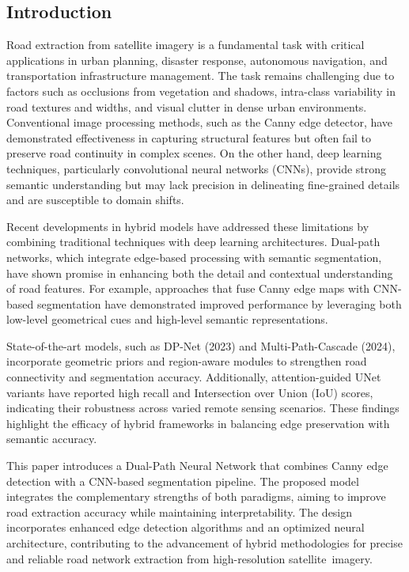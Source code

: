 \documentclass[11pt]{article}
\begin{document}
\begin{multicols}{2}

\section{Introduction}
Road extraction from satellite imagery is a fundamental task with critical applications in urban planning, disaster response, autonomous navigation, and transportation infrastructure management. The task remains challenging due to factors such as occlusions from vegetation and shadows, intra-class variability in road textures and widths, and visual clutter in dense urban environments. Conventional image processing methods, such as the Canny edge detector, have demonstrated effectiveness in capturing structural features but often fail to preserve road continuity in complex scenes. On the other hand, deep learning techniques, particularly convolutional neural networks (CNNs), provide strong semantic understanding but may lack precision in delineating fine-grained details and are susceptible to domain shifts.

Recent developments in hybrid models have addressed these limitations by combining traditional techniques with deep learning architectures. Dual-path networks, which integrate edge-based processing with semantic segmentation, have shown promise in enhancing both the detail and contextual understanding of road features. For example, approaches that fuse Canny edge maps with CNN-based segmentation have demonstrated improved performance by leveraging both low-level geometrical cues and high-level semantic representations.

State-of-the-art models, such as DP-Net (2023) and Multi-Path-Cascade (2024), incorporate geometric priors and region-aware modules to strengthen road connectivity and segmentation accuracy. Additionally, attention-guided UNet variants have reported high recall and Intersection over Union (IoU) scores, indicating their robustness across varied remote sensing scenarios. These findings highlight the efficacy of hybrid frameworks in balancing edge preservation with semantic accuracy.

This paper introduces a Dual-Path Neural Network that combines Canny edge detection with a CNN-based segmentation pipeline. The proposed model integrates the complementary strengths of both paradigms, aiming to improve road extraction accuracy while maintaining interpretability. The design incorporates enhanced edge detection algorithms and an optimized neural architecture, contributing to the advancement of hybrid methodologies for precise and reliable road network extraction from high-resolution satellite imagery.


\end{multicols}
\end{document}
